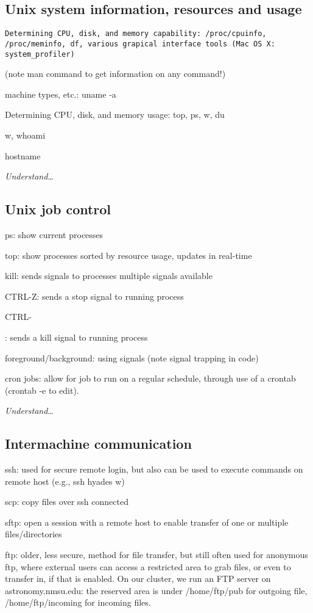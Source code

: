 \documentclass{article}
\newcommand{\test}[1]{%
    \begin{center}
        \colorbox{hl}{\parbox{0.9\textwidth}{\emph{#1}}}
    \end{center}}
\begin{document}
\subsection{Unix system information, resources and usage}
\begin{verbatim}
Determining CPU, disk, and memory capability: /proc/cpuinfo,
/proc/meminfo, df, various grapical interface tools (Mac OS X:
system_profiler)
\end{verbatim}

(note man command to get information on any command!)

machine types, etc.: uname -a

Determining CPU, disk, and memory usage: top, ps, w, du

w, whoami

hostname

\test{Understand\ldots}

\subsection{Unix job control}
ps: show current processes

top: show processes sorted by resource usage, updates in real-time

kill: sends signals to processes multiple signals available

CTRL-Z: sends a stop signal to running process

CTRL-

: sends a kill signal to running process

foreground/background: using signals (note signal trapping in code)

cron jobs: allow for job to run on a regular schedule, through use of
a crontab (crontab -e to edit).

\test{Understand\ldots}

\subsection{Intermachine communication}
ssh: used for secure remote login, but also can be used to execute
commands on remote host (e.g., ssh hyades w)

scp: copy files over ssh connected

sftp: open a session with a remote host to enable transfer of one or
multiple files/directories

ftp: older, less secure, method for file transfer, but still often
used for anonymous ftp, where external users can access a restricted
area to grab files, or even to transfer in, if that is enabled. On our
cluster, we run an FTP server on astronomy.nmsu.edu: the reserved area
is under /home/ftp/pub for outgoing file, /home/ftp/incoming for
incoming files.
\end{document}
